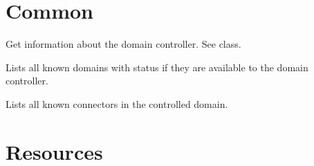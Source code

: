 \section{Common}

\begin{Api}

Get information about the domain controller. See  class.

Lists all known domains with status if they are available to the domain controller.

Lists all known connectors in the controlled domain.

\end{Api}


\section{Resources}


